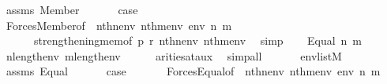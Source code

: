 \begin{isabellebody}
\ assms\ Member\isanewline
\ \ \isamarkupfalse%
\isanewline
\ \ \isamarkupfalse%
\ {\isacharquery}{\kern0pt}case\ \isanewline
\ \ \ \ \isamarkupfalse%
\ Forces{\isacharunderscore}{\kern0pt}Member{\isacharbrackleft}{\kern0pt}of\ {\isacharunderscore}{\kern0pt}\ {\isachardoublequoteopen}nth{\isacharparenleft}{\kern0pt}n{\isacharcomma}{\kern0pt}env{\isacharparenright}{\kern0pt}{\isachardoublequoteclose}\ {\isachardoublequoteopen}nth{\isacharparenleft}{\kern0pt}m{\isacharcomma}{\kern0pt}env{\isacharparenright}{\kern0pt}{\isachardoublequoteclose}\ env\ n\ m{\isacharbrackright}{\kern0pt}\isanewline
\ \ \ \ \ \ strengthening{\isacharunderscore}{\kern0pt}mem{\isacharbrackleft}{\kern0pt}of\ p\ r\ {\isachardoublequoteopen}nth{\isacharparenleft}{\kern0pt}n{\isacharcomma}{\kern0pt}env{\isacharparenright}{\kern0pt}{\isachardoublequoteclose}\ {\isachardoublequoteopen}nth{\isacharparenleft}{\kern0pt}m{\isacharcomma}{\kern0pt}env{\isacharparenright}{\kern0pt}{\isachardoublequoteclose}{\isacharbrackright}{\kern0pt}\ \isamarkupfalse%
\ simp\isanewline
{}\isamarkupfalse%
\isanewline
\ \ \isamarkupfalse%
\ {\isacharparenleft}{\kern0pt}Equal\ n\ m{\isacharparenright}{\kern0pt}\isanewline
\ \ \isamarkupfalse%
\isanewline
\ \ \isamarkupfalse%
\ {\isachardoublequoteopen}n{\isacharless}{\kern0pt}length{\isacharparenleft}{\kern0pt}env{\isacharparenright}{\kern0pt}{\isachardoublequoteclose}\ {\isachardoublequoteopen}m{\isacharless}{\kern0pt}length{\isacharparenleft}{\kern0pt}env{\isacharparenright}{\kern0pt}{\isachardoublequoteclose}\isanewline
\ \ \ \ \isamarkupfalse%
\ arities{\isacharunderscore}{\kern0pt}at{\isacharunderscore}{\kern0pt}aux\ \isamarkupfalse%
\ simp{\isacharunderscore}{\kern0pt}all\isanewline
\ \ \isamarkupfalse%
\isanewline
\ \ \isamarkupfalse%
\ {\isachardoublequoteopen}env{\isasymin}list{\isacharparenleft}{\kern0pt}M{\isacharparenright}{\kern0pt}{\isachardoublequoteclose}\isanewline
\ \ \isamarkupfalse%
\isanewline
\ \ \isamarkupfalse%
\ assms\ Equal\isanewline
\ \ \isamarkupfalse%
\isanewline
\ \ \isamarkupfalse%
\ {\isacharquery}{\kern0pt}case\ \isanewline
\ \ \ \ \isamarkupfalse%
\ Forces{\isacharunderscore}{\kern0pt}Equal{\isacharbrackleft}{\kern0pt}of\ {\isacharunderscore}{\kern0pt}\ {\isachardoublequoteopen}nth{\isacharparenleft}{\kern0pt}n{\isacharcomma}{\kern0pt}env{\isacharparenright}{\kern0pt}{\isachardoublequoteclose}\ {\isachardoublequoteopen}nth{\isacharparenleft}{\kern0pt}m{\isacharcomma}{\kern0pt}env{\isacharparenright}{\kern0pt}{\isachardoublequoteclose}\ env\ n\ m{\isacharbrackright}{\kern0pt}\isanewline

\end{isabellebody}

